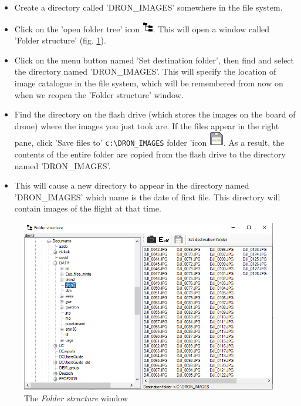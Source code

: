 \documentclass[a4paper,12pt]{article}
\begin{document}
\begin{itemize}
	\item Create a directory called 'DRON\_IMAGES' somewhere in the file system. 
	
	\item Click on the 'open folder tree' icon \includegraphics {open_folder_structure.png}. This will open a window called 'Folder structure' (fig. \ref{fig:folder_struc}). 
	
	\item Click on the menu button named 'Set destination folder', then find and select the directory named 'DRON\_IMAGES'. This will specify the location of image catalogue in the file system, which will be remembered from now on when we reopen the 'Folder structure' window.  
	
	\item Find the directory on the flash drive (which stores the images on the board of drone) where the images you just took are. If the files appear in the right pane, click 'Save files to' \verb|c:\DRON_IMAGES| folder 'icon \includegraphics{save.png}. As a result, the contents of the entire folder are copied from the flash drive to the directory named 'DRON\_IMAGES'. 
	
	\item This will cause a new directory to appear in the directory named 'DRON\_IMAGES' which name is the date of first file. This directory will contain images of the flight at that time. 
	
\end{itemize}

\begin{figure}
	\centering
	\includegraphics[width=13cm]{folder_struc.png}
	\caption{The \textit{Folder structure} window}
	\label{fig:folder_struc}
\end{figure}
\end{document}
